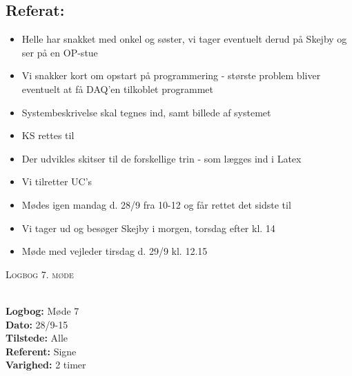 \documentclass[a4paper,11pt,oneside]{memoir}
\begin{document}
\subsection{Referat:}
\begin{itemize}
\item Helle har snakket med onkel og søster, vi tager eventuelt derud på Skejby og ser på en OP-stue
\item Vi snakker kort om opstart på programmering - største problem bliver eventuelt at få DAQ'en tilkoblet programmet 
\item Systembeskrivelse skal tegnes ind, samt billede af systemet 
\item KS rettes til 
\item Der udvikles skitser til de forskellige trin - som lægges ind i Latex
\item Vi tilretter UC's
\item Mødes igen mandag d. 28/9 fra 10-12 og får rettet det sidste til
\item Vi tager ud og besøger Skejby i morgen, torsdag efter kl. 14 
\item Møde med vejleder tirsdag d. 29/9 kl. 12.15
\end{itemize}

\newpage


\begin{center} 
\huge{\textsc{Logbog 7. møde}}
\end{center}

\textbf{ }
\\
\textbf{Logbog:} Møde 7
\\
\textbf{Dato:} 28/9-15
\\
\textbf{Tilstede:} Alle
\\
\textbf{Referent:} Signe
\\
\textbf{Varighed:} 2 timer
\\
\end{document}
